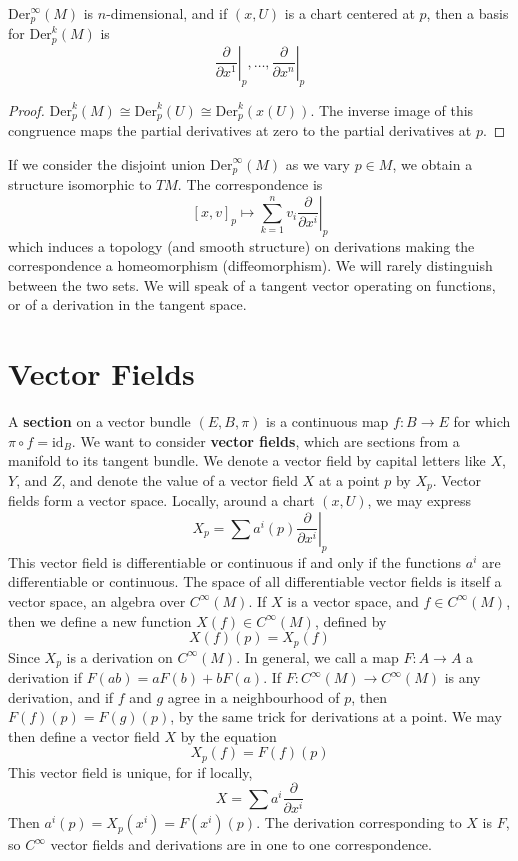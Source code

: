 \begin{theorem}
    $\text{Der}^\infty_p(M)$ is $n$-dimensional, and if $(x,U)$ is a chart centered at $p$, then a basis for $\text{Der}^k_p(M)$ is
    \[ \left.\frac{\partial}{\partial x^1}\right|_p, \dots, \left.\frac{\partial}{\partial x^n}\right|_p \]
\end{theorem}
\begin{proof}
    $\text{Der}^k_p(M) \cong \text{Der}^k_p(U) \cong \text{Der}^k_p(x(U))$. The inverse image of this congruence maps the partial derivatives at zero to the partial derivatives at $p$.
\end{proof}

If we consider the disjoint union $\text{Der}^\infty_p(M)$ as we vary $p \in M$, we obtain a structure isomorphic to $TM$. The correspondence is
%
\[ [x,v]_p \mapsto \sum_{k = 1}^n v_i \left.\frac{\partial}{\partial x^i}\right|_p \]
%
which induces a topology (and smooth structure) on derivations making the correspondence a homeomorphism (diffeomorphism). We will rarely distinguish between the two sets. We will speak of a tangent vector operating on functions, or of a derivation in the tangent space.

\section{Vector Fields}

A {\bf section} on a vector bundle $(E,B,\pi)$ is a continuous map $f:B \to E$ for which $\pi \circ f = \text{id}_B$. We want to consider {\bf vector fields}, which are sections from a manifold to its tangent bundle. We denote a vector field by capital letters like $X$, $Y$, and $Z$, and denote the value of a vector field $X$ at a point $p$ by $X_p$. Vector fields form a vector space. Locally, around a chart $(x,U)$, we may express
%
\[ X_p = \sum a^i(p) \left.\frac{\partial}{\partial x^i}\right|_p \]
%
This vector field is differentiable or continuous if and only if the functions $a^i$ are differentiable or continuous. The space of all differentiable vector fields is itself a vector space, an algebra over $C^\infty(M)$. If $X$ is a vector space, and $f \in C^\infty(M)$, then we define a new function $X(f) \in C^\infty(M)$, defined by
%
\[ X(f)(p) = X_p(f) \]
%
Since $X_p$ is a derivation on $C^\infty(M)$. In general, we call a map $F: A \to A$ a derivation if $F(ab) = a F(b) + b F(a)$. If $F: C^\infty(M) \to C^\infty(M)$ is any derivation, and if $f$ and $g$ agree in a neighbourhood of $p$, then $F(f)(p) = F(g)(p)$, by the same trick for derivations at a point. We may then define a vector field $X$ by the equation
%
\[ X_p(f) = F(f)(p) \]
%
This vector field is unique, for if locally,
%
\[ X = \sum a^i \frac{\partial}{\partial x^i} \]
%
Then $a^i(p) = X_p(x^i) = F(x^i)(p)$. The derivation corresponding to $X$ is $F$, so $C^\infty$ vector fields and derivations are in one to one correspondence.






